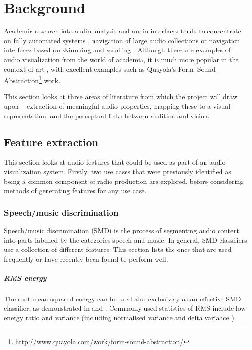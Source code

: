 \chapter{Background}\label{chpt:background}

Academic research into audio analysis and audio interfaces tends to concentrate
on fully automated systems \citep{AngueraMiro2012}, navigation of large audio
collections \citep{FontCorbera2010} or navigation interfaces based on skimming
\citep{Arons1997} and scrolling \citep{Lee2007}. Although there are examples of
audio visualization from the world of academia, it is much more popular in the
context of art \citep{Armitage2012}, with excellent examples such as Quayola's
Form--Sound--Abstraction\footnote{\url{http://www.quayola.com/work/form-sound-abstraction/}}
work.

This section looks at three areas of literature from which the project will
draw upon -- extraction of meaningful audio properties, mapping these to a
visual representation, and the perceptual links between audition and vision.

\section{Feature extraction}\label{sec:litreviewfeats}
This section looks at audio features that could be used as part of an audio
visualization system. Firstly, two use cases that were previously identified as
being a common component of radio production are explored, before considering
methods of generating features for any use case.

\subsection{Speech/music discrimination}
Speech/music discrimination (SMD) is the process of segmenting audio content
into parts labelled by the categories speech and music. In general, SMD
classifiers use a collection of different features. This section lists the ones
that are used frequently or have recently been found to perform well.

\paragraph{RMS energy}
The root mean squared energy can be used also exclusively as an effective SMD
classifier, as demonstrated in \citep{Ericsson2009} and \citep{Panagiotakis2005}.
Commonly used statistics of RMS include low energy ratio
\citep{Liang2005,Ericsson2009,Saunders1996,Scheirer1997} and variance
\citep{Ericsson2009} (including normalised variance \citep{Panagiotakis2005} and
delta variance \citep{Carey1999}).

